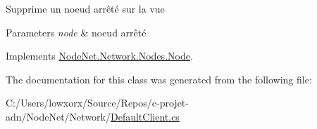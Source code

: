 Supprime un noeud arrêté sur la vue 


\begin{DoxyParams}{Parameters}
{\em node} & noeud arrêté\\
\hline
\end{DoxyParams}


Implements \hyperlink{class_node_net_1_1_network_1_1_nodes_1_1_node_a790d3239a1f0f8442450c060c015f9f3}{Node\+Net.\+Network.\+Nodes.\+Node}.



The documentation for this class was generated from the following file\+:\begin{DoxyCompactItemize}
\item 
C\+:/\+Users/lowxorx/\+Source/\+Repos/c-\/projet-\/adn/\+Node\+Net/\+Network/\hyperlink{_default_client_8cs}{Default\+Client.\+cs}\end{DoxyCompactItemize}
